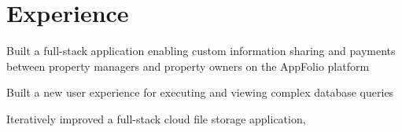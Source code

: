 \section{Experience}

\begin{tightemize}
\item Built a full-stack application enabling custom information sharing and payments between property managers and property owners on the AppFolio platform
\item Built a new user experience for executing and viewing complex database queries
\end{tightemize}
\sectionsep

\begin{tightemize}
\item Iteratively improved a full-stack cloud file storage application, 
\item {}
\end{tightemize}
\sectionsep

